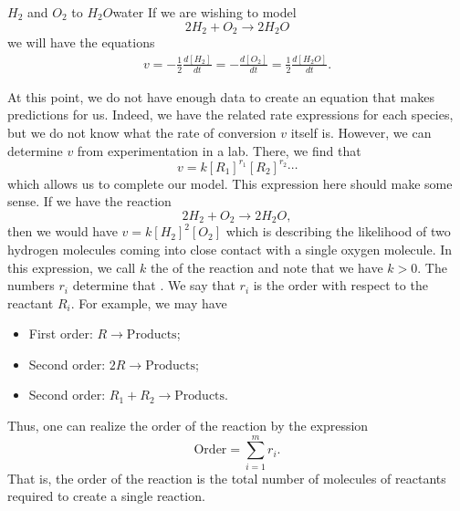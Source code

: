         \begin{ex}{$H_2$ and $O_2$ to $H_2O$}{water}
        If we are wishing to model
        \[
        2H_2 + O_2 \to 2H_2O
        \]
        we will have the equations
        \begin{align*}
            v=-\frac{1}{2}\frac{d[H_2]}{dt}=-\frac{d[O_2]}{dt}=\frac{1}{2}\frac{d[H_2O]}{dt}.
        \end{align*}
        \end{ex}
        
        At this point, we do not have enough data to create an equation that makes predictions for us. Indeed, we have the related rate expressions for each species, but we do not know what the rate of conversion $v$ itself is. However, we can determine $v$ from experimentation in a lab.  There, we find that
        \[
        v=k[R_1]^{r_1}[R_2]^{r_2}\cdots
        \]
        which allows us to complete our model. This expression here should make some sense.  If we have the reaction
        \[
            2H_2 + O_2 \to 2H_2 O,
        \]
        then we would have $v=k[H_2]^2 [O_2]$ which is describing the likelihood of two hydrogen molecules coming into close contact with a single oxygen molecule.  In this expression, we call $k$ the  of the reaction and note that we have $k>0$. The numbers $r_i$ determine that . We say that $r_i$ is the order with respect to the reactant $R_i$. For example, we may have
        \begin{itemize}
            \item First order: $R \to \textrm{Products}$;
            \item Second order: $2R \to \textrm{Products}$;
            \item Second order: $R_1+R_2 \to \textrm{Products}$.
        \end{itemize}
        Thus, one can realize the order of the reaction by the expression
        \[
            \textrm{Order} = \sum_{i=1}^m r_i.
        \]
        That is, the order of the reaction is the total number of molecules of reactants required to create a single reaction.

